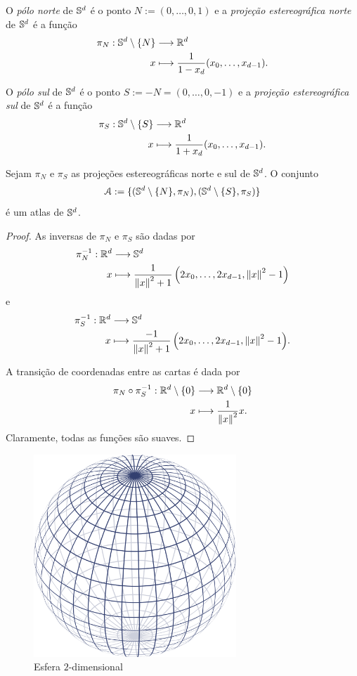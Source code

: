 \begin{defi}
O \emph{pólo norte} de $\S^d$ é o ponto $N := (0,\ldots,0,1)$ e a \emph{projeção estereográfica norte} de $\S^d$ é a função
	\begin{align*}
	\func{\pi_N}{\S^d \setminus\{N\}}{\R^d}{x}{\frac{1}{1-x_d}(x_0,\ldots,x_{d-1})}.
	\end{align*}

O \emph{pólo sul} de $\S^d$ é o ponto $S := -N = (0,\ldots,0,-1)$ e a \emph{projeção estereográfica sul} de $\S^d$ é a função
	\begin{align*}
	\func{\pi_S}{\S^d \setminus\{S\}}{\R^d}{x}{\frac{1}{1+x_d}(x_0,\ldots,x_{d-1})}.
	\end{align*}
\end{defi}

\begin{prop}
Sejam $\pi_N$ e $\pi_S$ as projeções estereográficas norte e sul de $\S^d$. O conjunto
	\begin{equation*}
	\atlas := \{(\S^d \setminus\{N\},\pi_N),(\S^d \setminus\{S\},\pi_S)\}
	\end{equation*}
é um atlas de $\S^d$.
\end{prop}
\begin{proof}
As inversas de $\pi_N$ e $\pi_S$ são dadas por
	\begin{align*}
	\func{\pi_N\inv}{\R^d}{\S^d}{x}{\frac{1}{\nor{x}^2 + 1}\left(2x_0,\ldots,2x_{d-1},\nor{x}^2 - 1\right)}
	\end{align*}
e
	\begin{align*}
	\func{\pi_S\inv}{\R^d}{\S^d}{x}{\frac{-1}{\nor{x}^2+1}\left(2x_0,\ldots,2x_{d-1},\nor{x}^2-1\right)}.
	\end{align*}

A transição de coordenadas entre as cartas é dada por
	\begin{align*}
	\func{\pi_N \circ \pi_S\inv}{\R^d \setminus\{0\}}{\R^d \setminus\{0\}}{x}{\frac{1}{\nor{x}^2}x}.
	\end{align*}
Claramente, todas as funções são suaves.
\end{proof}

\begin{figure}[!h]
\centering
\includegraphics[width=3in]{./imagens/esfera}
\caption{Esfera $2$-dimensional}
\end{figure}

